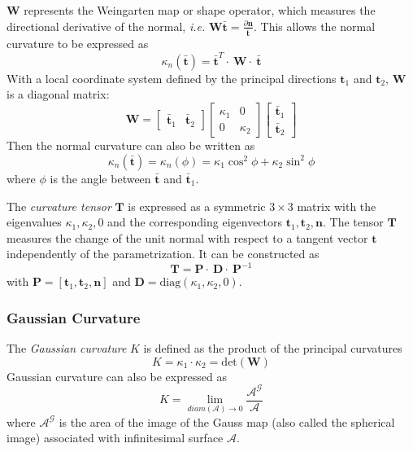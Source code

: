 \documentclass{InsightArticle}
\def \ie {\textit{i.e. }}
\theoremstyle{plain}
\begin{document}
$\mathbf{W}$ represents the Weingarten map or shape operator, which measures the directional derivative of the normal, \ie $\mathbf{W\bar{t}} = \frac{\partial \mathbf{n}}{\mathbf{\bar{t}}}$. This allows the normal curvature to be expressed as
\begin{equation*}
  \kappa_n(\mathbf{\bar{t}}) = \mathbf{\bar{t}}^T\cdot\ \mathbf{W}\cdot\ \mathbf{\bar{t}}
\end{equation*}
With a local coordinate system defined by the principal directions $\mathbf{t}_1$ and $\mathbf{t}_2$, $\mathbf{W}$ is a diagonal matrix:
\begin{equation}
  \mathbf{W} =
\left[
  \begin{array}{cc}
  \mathbf{\bar{t}}_1 & \mathbf{\bar{t}}_2
  \end{array}
\right]
\left[
  \begin{array}{cc}
  \kappa_1 & 0\\
  0 & \kappa_2
  \end{array}
\right]
\left[
  \begin{array}{c}
    \mathbf{\bar{t}}_1\\
    \mathbf{\bar{t}}_2
  \end{array}
\right]
\end{equation}
Then the normal curvature can also be written as
\begin{equation}
  \kappa_n(\mathbf{\bar{t}}) = \kappa_n(\phi) = \kappa_1 \cos^2 \phi + \kappa_2 \sin^2 \phi
\end{equation}
where $\phi$ is the angle between $\mathbf{\bar{t}}$ and $\mathbf{\bar{t}}_1$.

The \emph{curvature tensor} $\mathbf{T}$ is expressed as a symmetric $3\times 3$ matrix with the eigenvalues $\kappa_1, \kappa_2, 0$ and the corresponding eigenvectors $\mathbf{t}_1, \mathbf{t}_2, \mathbf{n}$. The tensor $\mathbf{T}$ measures the change of the unit normal with respect to a tangent vector $\mathbf{t}$ independently of the parametrization. It can be constructed as
\begin{equation}
  \mathbf{T} = \mathbf{P}\cdot\ \mathbf{D}\cdot\ \mathbf{P}^{-1}
\end{equation}
with $\mathbf{P}=\left[\mathbf{t}_1, \mathbf{t}_2, \mathbf{n}\right]$ and $\mathbf{D}=\text{diag}(\kappa_1, \kappa_2, 0)$.

\subsubsection{Gaussian Curvature}
The \emph{Gaussian curvature} $K$ is defined as the product of the principal curvatures
\begin{equation}
  K = \kappa_1\cdot \kappa_2 = \text{det}(\mathbf{W}) \label{eq:GaussCurvatureDef1}
\end{equation}
Gaussian curvature can also be expressed as
\begin{equation}
  K = \lim_{diam(\mathcal{A})\rightarrow 0} \frac{\mathcal{A}^{\mathcal{G}}}{\mathcal{A}}
\end{equation}
where $\mathcal{A}^{\mathcal{G}}$ is the area of the image of the Gauss map (also called the spherical image) associated with infinitesimal surface $\mathcal{A}$.
\end{document}
